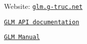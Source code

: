 
\begin{DoxyItemize}
\item Website\+: \href{https://glm.g-truc.net}{\tt glm.\+g-\/truc.\+net}
\item \href{modules.html}{\tt G\+LM A\+PI documentation}
\item \href{https://github.com/g-truc/glm/blob/master/manual.md}{\tt G\+LM Manual} 
\end{DoxyItemize}